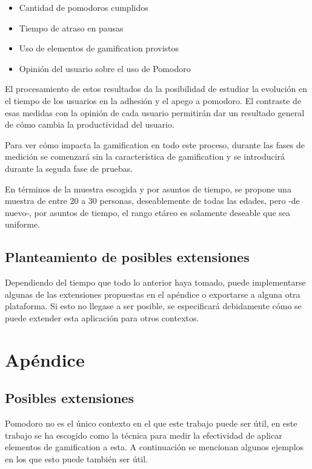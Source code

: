 \documentclass[12pt,letterpaper]{report}
\begin{document}
\begin{itemize}
  \item Cantidad de pomodoros cumplidos
  \item Tiempo de atraso en pausas
  \item Uso de elementos de gamification provistos
  \item Opinión del usuario sobre el uso de Pomodoro
\end{itemize}

El procesamiento de estos resultados da la posibilidad de estudiar la evolución en el tiempo de los usuarios en la
adhesión y el apego a pomodoro. El contraste de esas medidas con la opinión de cada usuario permitirán dar un resultado
general de cómo cambia la productividad del usuario.

Para ver cómo impacta la gamification en todo este proceso, durante las fases de medición se comenzará sin la
característica de gamification y se introducirá durante la seguda fase de pruebas. 

En términos de la muestra escogida y por asuntos de tiempo, se propone una muestra de entre 20 a 30 personas,
deseablemente de todas las edades, pero -de nuevo-, por asuntos de tiempo, el rango etáreo es solamente deseable que sea
uniforme.

\hypertarget{planteamiento-de-posibles-extensiones}{%
\subsection{Planteamiento de posibles
extensiones}\label{planteamiento-de-posibles-extensiones}}

Dependiendo del tiempo que todo lo anterior haya tomado, puede
implementarse algunas de las extensiones propuestas en el apéndice o
exportarse a alguna otra plataforma. Si esto no llegase a ser posible,
se especificará debidamente cómo se puede extender esta aplicación para
otros contextos.

\newpage
\section{Apéndice}\label{sec:apendice}

\subsection{Posibles extensiones}\label{subsec:posibles-extensiones}

Pomodoro no es el único contexto en el que este trabajo puede ser
útil, en este trabajo se ha escogido como la técnica para medir la
efectividad de aplicar elementos de gamification a esta. A
continuación se mencionan algunos ejemplos en los que esto puede
también ser útil.
\end{document}
